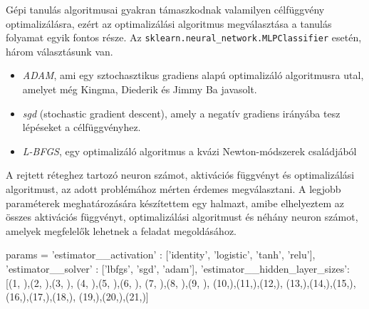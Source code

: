 Gépi tanulás algoritmusai gyakran támaszkodnak valamilyen célfüggvény optimalizálásra, ezért az optimalizálási algoritmus megválasztása a tanulás folyamat egyik fontos része.
Az \texttt{sklearn.neural\_network.MLPClassifier} esetén, három választásunk van.
\begin{itemize}
\item \textit{ADAM}, ami egy sztochasztikus gradiens alapú optimalizáló algoritmusra utal, amelyet még Kingma, Diederik és Jimmy Ba javasolt.
\item \textit{sgd} (stochastic gradient descent), amely a negatív gradiens irányába tesz lépéseket a célfüggvényhez.
\item \textit{L-BFGS}, egy  optimalizáló algoritmus a kvázi Newton-módszerek családjából
\end{itemize}

A rejtett réteghez tartozó neuron számot, aktivációs függvényt és optimalizálási algoritmust, az adott problémához mérten érdemes megválasztani. A legjobb paraméterek meghatározására készítettem egy halmazt, amibe elhelyeztem az összes aktivációs függvényt, optimalizálási algoritmust és néhány neuron számot, amelyek megfelelők lehetnek a feladat megoldásához.

\begin{python}
params = {
            'estimator__activation' : ['identity', 'logistic',
            			       'tanh', 'relu'],
            'estimator__solver' : ['lbfgs', 'sgd', 'adam'],
            'estimator__hidden_layer_sizes': [(1, ),(2, ),(3, ),
            				      (4, ),(5, ),(6, ),
            				      (7, ),(8, ),(9, ),
            				      (10,),(11,),(12,),
            				      (13,),(14,),(15,),
            				      (16,),(17,),(18,),
            				      (19,),(20,),(21,)]
}
\end{python}


